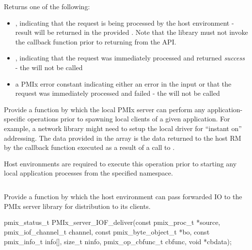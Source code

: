 Returns one of the following:

\begin{itemize}
    \item {}, indicating that the request is being processed by the host environment - result will be returned in the provided . Note that the library must not invoke the callback function prior to returning from the \ac{API}.
    \item {}, indicating that the request was immediately processed and returned \textit{success} - the  will not be called
    \item a PMIx error constant indicating either an error in the input or that the request was immediately processed and failed - the  will not be called
\end{itemize}


\descr

Provide a function by which the local \ac{PMIx} server can perform any application-specific operations prior to spawning local clients of a given application. For example, a network library might need to setup the local driver for ``instant on'' addressing. The data provided in the  array is the data returned to the host \ac{RM} by the callback function executed as a result of a call to .

\advicermstart
Host environments are required to execute this operation prior to starting any local application processes from the specified namespace.
\advicermend

\subsection{}

\summary

Provide a function by which the host environment can pass forwarded \ac{IO} to the \ac{PMIx} server library for distribution to its clients.

\format

\cspecificstart
\begin{codepar}
pmix_status_t
PMIx_server_IOF_deliver(const pmix_proc_t *source,
                        pmix_iof_channel_t channel,
                        const pmix_byte_object_t *bo,
                        const pmix_info_t info[], size_t ninfo,
                        pmix_op_cbfunc_t cbfunc, void *cbdata);
\end{codepar}
\cspecificend

